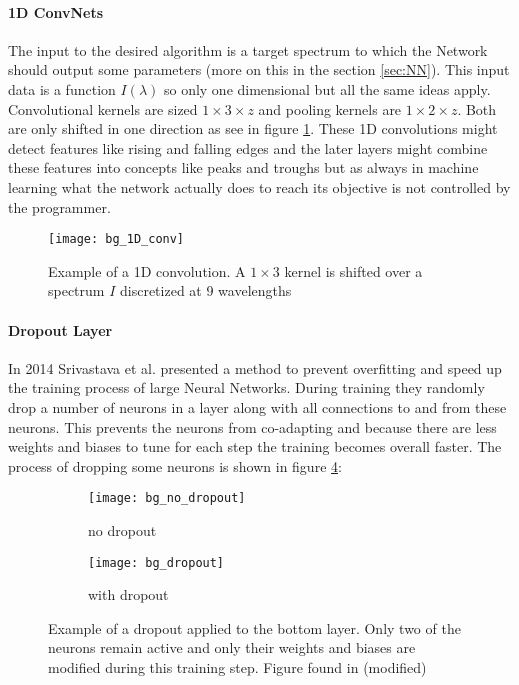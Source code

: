 \paragraph{1D ConvNets}
The input to the desired algorithm is a target spectrum to which the Network should output some parameters (more on this in the section \ref{sec:NN}). This input data is a function $I(\lambda)$ so only one dimensional but all the same ideas apply. Convolutional kernels are sized $1 \times 3 \times z$ and pooling kernels are $1 \times 2 \times z$. Both are  only shifted in one direction as see in figure \ref{fig:bg:1D_conv}. These 1D convolutions might detect features like rising and falling edges and the later layers might combine these features into concepts like peaks and troughs but as always in machine learning what the network actually does to reach its objective is not controlled by the programmer.

\begin{figure}[H]
    \centering
    \texttt{[image: bg\_1D\_conv]}
    \caption{Example of a 1D convolution. A $1 \times 3$ kernel is shifted over a spectrum $I$ discretized at 9 wavelengths}
    \label{fig:bg:1D_conv}
\end{figure}

\paragraph{Dropout Layer}
In 2014 Srivastava et al.\cite{Srivastava2014} presented a method to prevent overfitting and speed up the training process of large Neural Networks. During training they randomly drop a number of neurons in a layer along with all connections to and from these neurons. This prevents the neurons from co-adapting  and because there are less weights and biases to tune for each step the training becomes overall faster. The process of dropping some neurons is shown in figure \ref{fig:bg:dropout}:

\begin{figure}[H]
\centering
\begin{subfigure}{.5\textwidth}
    \centering
    \texttt{[image: bg\_no\_dropout]}
    \caption{no dropout}
    \label{}
\end{subfigure}%
\begin{subfigure}{.5\textwidth}
    \centering
    \texttt{[image: bg\_dropout]}
    \caption{with dropout}
    \label{}
\end{subfigure}
\caption{Example of a dropout applied to the bottom layer. Only two of the neurons remain active and only their weights and biases are modified during this training step. Figure found in \cite{Srivastava2014} (modified)}
\label{fig:bg:dropout}
\end{figure}

